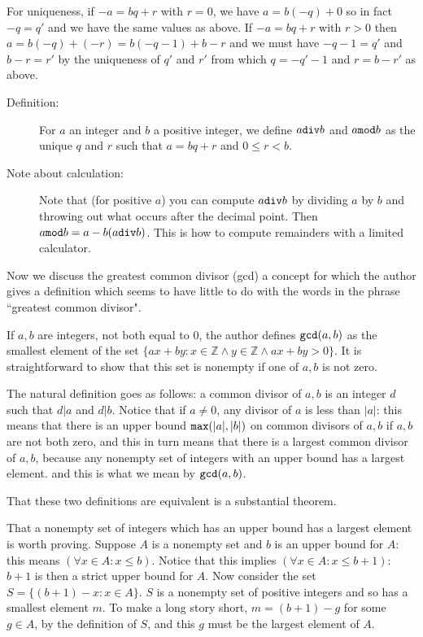 \documentclass[12pt]{article}
\begin{document}
For uniqueness, if $-a=bq+r$ with $r=0$, we have $a=b(-q) + 0$ so in fact $-q=q'$ and we have the same
values as above.  If $-a=bq+r$ with $r>0$ then $a=b(-q) + (-r) = b(-q-1) +b-r$ and we must have $-q-1=q'$
and $b-r=r'$ by the uniqueness of $q'$ and $r'$ from which $q= -q'-1$ and $r=b-r'$ as above.

\begin{description}

\item[Definition:]  For $a$ an integer and $b$ a positive integer, we define $a {\tt div} b$ and $a {\tt mod} b$
as the unique $q$ and $r$ such that $a=bq+r$ and $0 \leq r <b$.

\item[Note about calculation:]  Note that (for positive $a$) you can compute $a {\tt div} b$ by dividing $a$ by $b$ and throwing out what occurs after the decimal point.  Then $a{\tt mod}b = a - b(a{\tt div} b)$.  This is how to compute remainders with a limited calculator.

\end{description}

Now we discuss the greatest common divisor (gcd) a concept for which the author gives a definition which seems to have little to do with the words in the phrase ``greatest common divisor".

If $a,b$ are integers, not both equal to 0, the author defines ${\tt gcd}(a,b)$ as the smallest element of the set
$\{ax+by: x \in {\mathbb Z} \wedge y \in {\mathbb Z} \wedge ax+by>0\}$.  It is straightforward to show that this
set is nonempty if one of $a,b$ is not zero.

The natural definition goes as follows:  a common divisor of $a,b$ is an integer $d$ such that $d|a$ and $d|b$.
Notice that if $a \neq 0$, any divisor of $a$ is less than $|a|$:  this means that there is an upper bound ${\tt max}(|a|,|b|)$ on common divisors of $a,b$ if $a,b$ are not both zero, and this in turn means that there is a largest common divisor of $a,b$, because any nonempty set of integers with an upper bound has a largest element.  and this is what we mean by ${\tt gcd}(a,b)$.

That these two definitions are equivalent is a substantial theorem.

That a nonempty set of integers which has an upper bound has a largest element is worth proving.  Suppose $A$ is a nonempty set and $b$ is an upper bound for $A$:  this means $(\forall x \in A:x \leq b)$.  Notice that this implies
$(\forall x \in A:x \leq b+1)$:  $b+1$ is then a strict upper bound for $A$.  Now consider the set $S = \{(b+1)-x:x \in A\}$.  $S$ is a nonempty set of positive integers and so has a smallest element $m$.  To make a long story short,
$m=(b+1)-g$ for some $g \in A$, by the definition of $S$, and this $g$ must be the largest element of $A$.
\end{document}
